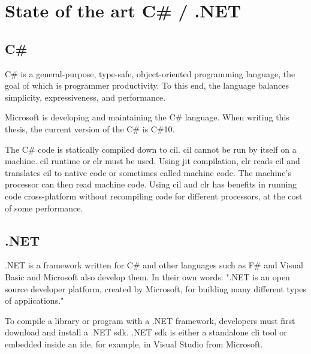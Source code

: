 \chapter {State of the art C\# / .NET }

\section {C\#}
C\# is a general-purpose, type-safe, object-oriented programming language, the goal of which is programmer productivity.
To this end, the language balances simplicity, expressiveness,
and performance. \cite{albahari_c_2019}

Microsoft is developing and maintaining the C\# language. When writing this thesis, the current version of the C\# is C\#10.

The C\# code is statically compiled down to \acrlong{cil}. \acrshort{cil} cannot be run by itself on a machine.
\acrshort{cil} runtime or \acrfull{clr} must be used. Using \acrfull{jit} compilation, \acrshort{clr} reads \acrshort{cil} and translates \acrshort{cil} to native
code or sometimes called machine code. The machine's processor can then read machine code. Using \acrshort{cil} and \acrshort{clr} has benefits in running code
cross-platform without recompiling code for different processors, at the cost of some performance. \cite{rodenburg_code_2021}

\section {.NET}

.NET is a framework written for C\# and other languages such as F\# and
Visual Basic and Microsoft also develop them.
In their own words: ".NET is an open source developer
platform, created by Microsoft, for building many different types of applications." \cite{noauthor_what_nodate-2}

To compile a library or program with a .NET framework,
developers must first download and install a .NET \acrfull{sdk}.
.NET \acrfull{sdk} is either a standalone \acrfull{cli} tool or embedded inside an \acrshort{ide},
for example, in Visual Studio from Microsoft.